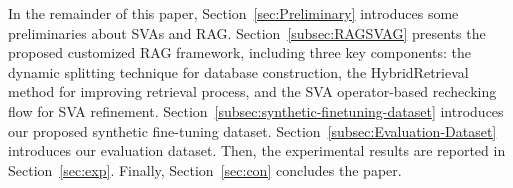 

In the remainder of this paper, Section~\ref{sec:Preliminary} introduces some preliminaries about SVAs and RAG. 
Section~\ref{subsec:RAGSVAG} presents the proposed customized RAG framework, including three key components: the dynamic splitting technique for database construction, the HybridRetrieval method for improving retrieval process, and the SVA operator-based rechecking flow for SVA refinement. 
Section~\ref{subsec:synthetic-finetuning-dataset} introduces our proposed synthetic fine-tuning dataset.
Section~\ref{subsec:Evaluation-Dataset} introduces our evaluation dataset. 
Then, the experimental results are reported in Section~\ref{sec:exp}. 
Finally, Section~\ref{sec:con} concludes the paper.